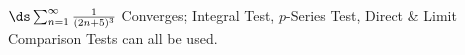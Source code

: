 {$\ds \sum_{n=1}^\infty \frac{1}{(2n+5)^3}$
}
{Converges; Integral Test, $p$-Series Test, Direct \& Limit Comparison Tests can all be used.
}